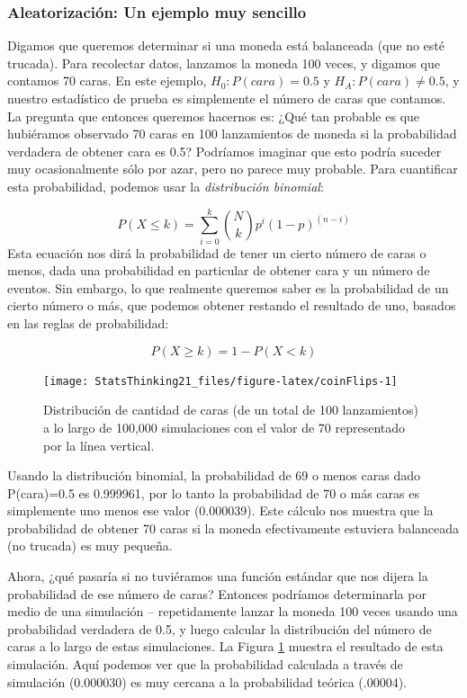 \documentclass[
  12pt,
]{book}
\theoremstyle{definition}
\theoremstyle{definition}
\theoremstyle{definition}
\theoremstyle{remark}
\begin{document}
\hypertarget{randomization-very-simple}{%
\subsubsection{Aleatorización: Un ejemplo muy sencillo}\label{randomization-very-simple}}

Digamos que queremos determinar si una moneda está balanceada (que no esté trucada). Para recolectar datos, lanzamos la moneda 100 veces, y digamos que contamos 70 caras. En este ejemplo, \(H_0: P(cara)=0.5\) y \(H_A: P(cara) \neq 0.5\), y nuestro estadístico de prueba es simplemente el número de caras que contamos. La pregunta que entonces queremos hacernos es: ¿Qué tan probable es que hubiéramos observado 70 caras en 100 lanzamientos de moneda si la probabilidad verdadera de obtener cara es 0.5? Podríamos imaginar que esto podría suceder muy ocasionalmente sólo por azar, pero no parece muy probable. Para cuantificar esta probabilidad, podemos usar la \emph{distribución binomial}:

\[
P(X \le k) = \sum_{i=0}^k \binom{N}{k} p^i (1-p)^{(n-i)}
\]
Esta ecuación nos dirá la probabilidad de tener un cierto número de caras o menos, dada una probabilidad en particular de obtener cara y un número de eventos. Sin embargo, lo que realmente queremos saber es la probabilidad de un cierto número o más, que podemos obtener restando el resultado de uno, basados en las reglas de probabilidad:

\[
P(X \ge k) = 1 - P(X < k)
\]

\begin{figure}
\texttt{[image: StatsThinking21\_files/figure-latex/coinFlips-1]} \caption{Distribución de cantidad de caras (de un total de 100 lanzamientos) a lo largo de 100,000 simulaciones  con el valor de 70 representado por la línea vertical.}\label{fig:coinFlips}
\end{figure}

Usando la distribución binomial, la probabilidad de 69 o menos caras dado P(cara)=0.5 es 0.999961, por lo tanto la probabilidad de 70 o más caras es simplemente uno menos ese valor (0.000039).
Este cálculo nos muestra que la probabilidad de obtener 70 caras si la moneda efectivamente estuviera balanceada (no trucada) es muy pequeña.

Ahora, ¿qué pasaría si no tuviéramos una función estándar que nos dijera la probabilidad de ese número de caras? Entonces podríamos determinarla por medio de una simulación -- repetidamente lanzar la moneda 100 veces usando una probabilidad verdadera de 0.5, y luego calcular la distribución del número de caras a lo largo de estas simulaciones. La Figura \ref{fig:coinFlips} muestra el resultado de esta simulación. Aquí podemos ver que la probabilidad calculada a través de simulación (0.000030) es muy cercana a la probabilidad teórica (.00004).
\end{document}
